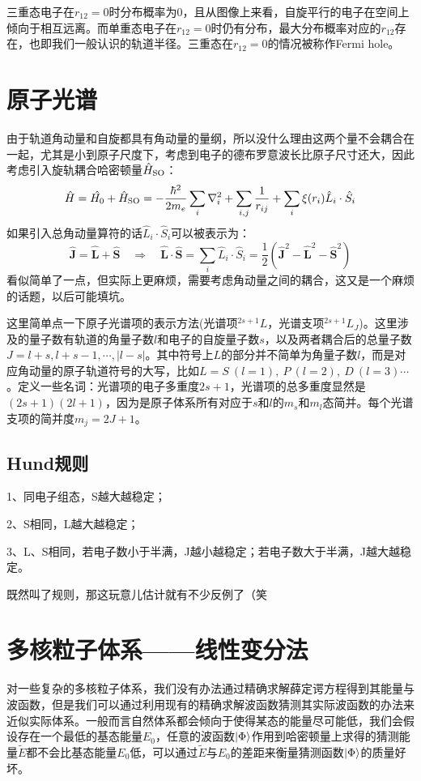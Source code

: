 三重态电子在$r_{12}=0$时分布概率为0，且从图像上来看，自旋平行的电子在空间上倾向于相互远离。而单重态电子在$r_{12}=0$时仍有分布，最大分布概率对应的$r_{12}$存在，也即我们一般认识的轨道半径。三重态在$r_{12}=0$的情况被称作Fermi hole。

\section{原子光谱}
由于轨道角动量和自旋都具有角动量的量纲，所以没什么理由这两个量不会耦合在一起，尤其是小到原子尺度下，考虑到电子的德布罗意波长比原子尺寸还大，因此考虑引入旋轨耦合哈密顿量$\hat{H}_{\rm{SO}}$：
\[\hat{H}=\hat{H_0}+\hat{H}_{\rm{SO}}=-\frac{\hbar^2}{2m_e}\sum_i\nabla^2_i+\sum_{i,j}\frac{1}{r_{ij}}+\sum_{i}\xi(r_i)\hat{L}_i\cdot\hat{S}_i\]
如果引入总角动量算符的话$\hat{L}_i \cdot \hat{S}_i$可以被表示为：
\[\hat{\bm{J}}=\hat{\bm{L}}+\hat{\bm{S}} \quad \Rightarrow \quad \hat{\bm{L}}\cdot\hat{\bm{S}}=\sum_i\hat{L}_i\cdot\hat{S}_i=\frac{1}{2}(\hat{\bm{J}}^2-\hat{\bm{L}}^2-\hat{\bm{S}}^2)\]
看似简单了一点，但实际上更麻烦，需要考虑角动量之间的耦合，这又是一个麻烦的话题，以后可能填坑。

这里简单点一下原子光谱项的表示方法(光谱项$^{2s+1}L$，光谱支项$^{2s+1}L_J$)。这里涉及的量子数有轨道的角量子数$l$和电子的自旋量子数$s$，以及两者耦合后的总量子数$J=l+s,l+s-1,\cdots,|l-s|$。其中符号上$L$的部分并不简单为角量子数$l$，而是对应角动量的原子轨道符号的大写，比如$L=S \ (l=1), \ P \ (l=2), \ D \ (l=3)\cdots$。定义一些名词：光谱项的电子多重度$2s+1$，光谱项的总多重度显然是$(2s+1)(2l+1)$，因为是原子体系所有对应于$s$和$l$的$m_s$和$m_l$态简并。每个光谱支项的简并度$m_j=2J+1$。

\subsection{Hund规则}
1、同电子组态，S越大越稳定；

2、S相同，L越大越稳定；

3、L、S相同，若电子数小于半满，J越小越稳定；若电子数大于半满，J越大越稳定。

既然叫了规则，那这玩意儿估计就有不少反例了（笑

\section{多核粒子体系——线性变分法}
对一些复杂的多核粒子体系，我们没有办法通过精确求解薛定谔方程得到其能量与波函数，但是我们可以通过利用现有的精确求解波函数猜测其实际波函数的办法来近似实际体系。一般而言自然体系都会倾向于使得某态的能量尽可能低，我们会假设存在一个最低的基态能量$E_0$，任意的波函数$\ket{\Phi}$作用到哈密顿量上求得的猜测能量$\tilde{E}$都不会比基态能量$E_0$低，可以通过$\tilde{E}$与$E_0$的差距来衡量猜测函数$\ket{\Phi}$的质量好坏。

